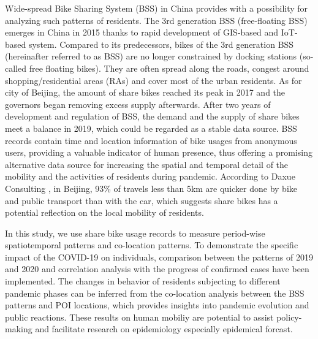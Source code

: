 \documentclass[preprints,ijgi,submit,moreauthors]{Definitions/mdpi}
\begin{document}
Wide-spread Bike Sharing System (BSS) in China provides with a possibility for analyzing such patterns of residents.
The 3rd generation BSS (free-floating BSS) emerges in China in 2015 thanks to rapid development of GIS-based and IoT-based system. 
Compared to its predecessors, bikes of the 3rd generation BSS (hereinafter referred to as BSS) are no longer constrained by docking stations (so-called free floating bikes).
They are often spread along the roads, congest around shopping/residential areas (RAs) and cover most of the urban residents. 
As for city of Beijing, the amount of share bikes reached its peak in 2017 and the governors began removing excess supply afterwards. 
After two years of development and regulation of BSS, the demand and the supply of share bikes meet a balance in 2019, which could be regarded as a stable data source.
BSS records contain time and location information of bike usages from anonymous users, providing a valuable indicator of human presence, thus offering a promising alternative data source for increasing the spatial and temporal detail of the mobility and the activities of residents during pandemic.
According to Daxue Consulting \cite{bssmodel}, in Beijing, 93\% of travels less than 5km are quicker done by bike and public transport than with the car, which suggests share bikes has a potential reflection on the local mobility of residents.

In this study, we use share bike usage records to measure period-wise spatiotemporal patterns and co-location patterns. 
To demonstrate the specific impact of the COVID-19 on individuals, comparison between the patterns of 2019 and 2020 and correlation analysis with the progress of confirmed cases have been implemented.
The changes in behavior of residents subjecting to different pandemic phases can be inferred from the co-location analysis between the BSS patterns and POI locations, which provides insights into pandemic evolution and public reactions.
These results on human mobiliy are potential to assist policy-making and facilitate research on epidemiology especially epidemical forcast.
\end{document}

